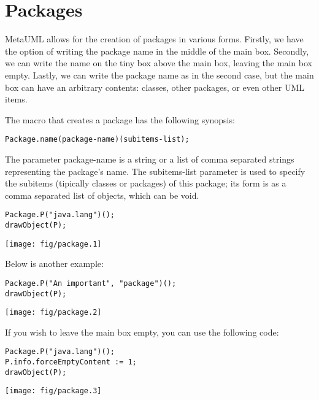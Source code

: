 \documentclass{article}
\newcommand{\code}{\ttfamily}
\begin{document}
\section{Packages}

MetaUML allows for the creation of packages in various forms. Firstly, we have the option of writing the package name in the middle of the main box. Secondly, we can write the name on the tiny box above the main box, leaving the main box empty. Lastly, we can write the package name as in the second case, but the main box can have an arbitrary contents: classes, other packages, or even other UML items. 

The macro that creates a package has the following synopsis:

\begin{verbatim}
Package.name(package-name)(subitems-list);
\end{verbatim}

The parameter {\code package-name} is a string or a list of comma separated strings representing the package's name. The {\code subitems-list} parameter is used to specify the subitems (tipically classes or packages) of this package; its form is as a comma separated list of objects, which can be void.

\begin{multicols}{2}
\begin{verbatim}
Package.P("java.lang")();
drawObject(P);
\end{verbatim}
\columnbreak
\hspace{3cm}\texttt{[image: fig/package.1]}
\end{multicols}

Below is another example:

\begin{multicols}{2}
\begin{verbatim}
Package.P("An important", "package")();
drawObject(P);
\end{verbatim}
\columnbreak
\hspace{3cm}\texttt{[image: fig/package.2]}
\end{multicols}

If you wish to leave the main box empty, you can use the following code:

\begin{multicols}{2}
\begin{verbatim}
Package.P("java.lang")();
P.info.forceEmptyContent := 1;
drawObject(P);
\end{verbatim}
\columnbreak
\hspace{3cm}\texttt{[image: fig/package.3]}
\end{multicols}
\end{document}

